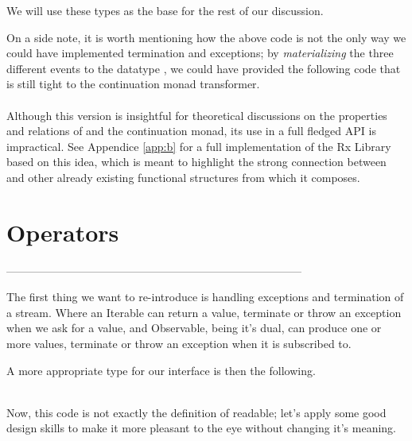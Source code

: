 We will use these types as the base for the rest of our discussion.

On a side note, it is worth mentioning how the above code is not the only way we could have implemented termination and exceptions; by \textit{materializing} the three different events to the datatype , we could have provided the following code that is still tight to the continuation monad transformer.\\

\\

Although this version is insightful for theoretical discussions on the properties and relations of  and the continuation monad, its use in a full fledged API is impractical. See Appendice \ref{app:b} for a full implementation of the Rx Library based on this idea, which is meant to highlight the strong connection between  and other already existing functional structures from which it composes. 

\section{Operators}

--------------------------------------------------------------------------------

The first thing we want to re-introduce is handling exceptions and termination of a stream. Where an Iterable can return a value, terminate or throw an exception when we ask for a value, and Observable, being it's dual, can produce one or more values, terminate or throw an exception when it is subscribed to. 

A more appropriate type for our interface is then the following.\\

\\


Now, this code is not exactly the definition of readable; let's apply some good design skills to make it more pleasant to the eye without changing it's meaning.\\

\\

